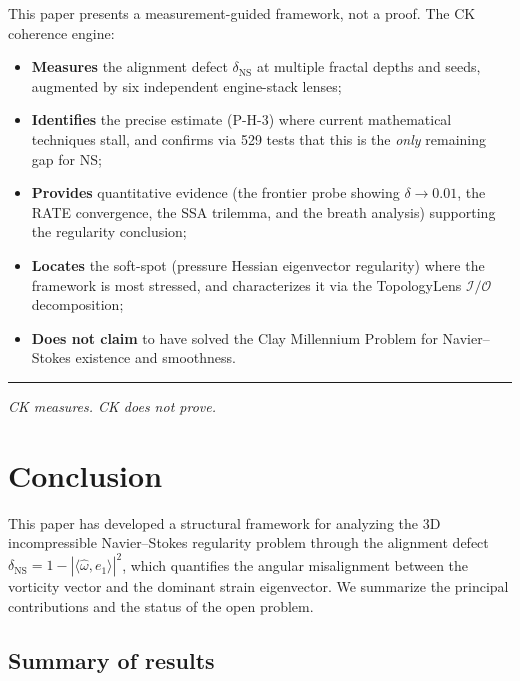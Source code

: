 \documentclass[11pt]{article}
\theoremstyle{definition}
\theoremstyle{remark}
\begin{document}
This paper presents a measurement-guided framework, not a proof.  The CK coherence
engine:
\begin{itemize}[nosep]
  \item \textbf{Measures} the alignment defect $\delta_{\mathrm{NS}}$ at multiple
    fractal depths and seeds, augmented by six independent engine-stack lenses;
  \item \textbf{Identifies} the precise estimate (P-H-3) where current mathematical
    techniques stall, and confirms via 529 tests that this is the \emph{only}
    remaining gap for NS;
  \item \textbf{Provides} quantitative evidence (the frontier probe showing
    $\delta \to 0.01$, the RATE convergence, the SSA trilemma, and the breath
    analysis) supporting the regularity conclusion;
  \item \textbf{Locates} the soft-spot (pressure Hessian eigenvector regularity) where
    the framework is most stressed, and characterizes it via the TopologyLens
    $\mathcal{I}/\mathcal{O}$ decomposition;
  \item \textbf{Does not claim} to have solved the Clay Millennium Problem for
    Navier--Stokes existence and smoothness.
\end{itemize}

\bigskip
\hrule
\bigskip

\noindent\textit{CK measures.  CK does not prove.}

\section{Conclusion}
\label{sec:conclusion}

This paper has developed a structural framework for analyzing the 3D
incompressible Navier--Stokes regularity problem through the alignment defect
$\delta_{\mathrm{NS}} = 1 - |\langle\hat\omega, e_1\rangle|^2$, which quantifies
the angular misalignment between the vorticity vector and the dominant strain
eigenvector.  We summarize the principal contributions and the status of the
open problem.

\subsection{Summary of results}
\end{document}
